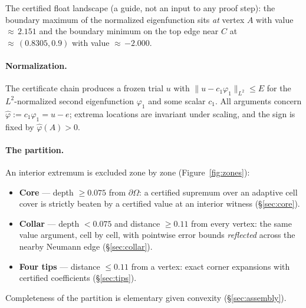 \documentclass[11pt]{article}
\newcommand{\norm}[1]{\lVert #1 \rVert}
\newcommand{\phih}{\hat\varphi}
\begin{document}
The certified float landscape (a guide, not an input to any proof step):
the boundary maximum of the normalized eigenfunction sits \emph{at}
vertex $A$ with value ${\approx}\,2.151$ and the boundary minimum on the
top edge near $C$ at ${\approx}\,(0.8305, 0.9)$ with value
${\approx}\,{-2.000}$.

\paragraph{Normalization.}
The certificate chain produces a frozen trial $u$ with
$\norm{u-c_1\varphi_1}_{L^2}\le E$ for the $L^2$-normalized second
eigenfunction $\varphi_1$ and some scalar $c_1$. All arguments concern
$\phih:=c_1\varphi_1=u-e$; extrema locations are invariant under scaling,
and the sign is fixed by $\phih(A)>0$.

\paragraph{The partition.}
An interior extremum is excluded zone by zone (Figure~\ref{fig:zones}):
\begin{itemize}
\item \textbf{Core} --- depth $\ge 0.075$ from $\partial\Omega$: a
certified supremum over an adaptive cell cover is strictly beaten by a
certified value at an interior witness (\S\ref{sec:core}).
\item \textbf{Collar} --- depth $<0.075$ and distance $\ge 0.11$ from
every vertex: the same value argument, cell by cell, with pointwise
error bounds \emph{reflected} across the nearby Neumann edge
(\S\ref{sec:collar}).
\item \textbf{Four tips} --- distance $\le 0.11$ from a vertex: exact
corner expansions with certified coefficients (\S\ref{sec:tips}).
\end{itemize}
Completeness of the partition is elementary given convexity
(\S\ref{sec:assembly}).
\end{document}
